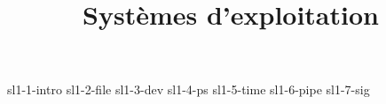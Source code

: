 \documentclass {beamer}
\title {Systèmes d'exploitation}
\begin{document}

 {sl1-1-intro}
 {sl1-2-file}
 {sl1-3-dev}
 {sl1-4-ps}
 {sl1-5-time}
 {sl1-6-pipe}
 {sl1-7-sig}
\end{document}
